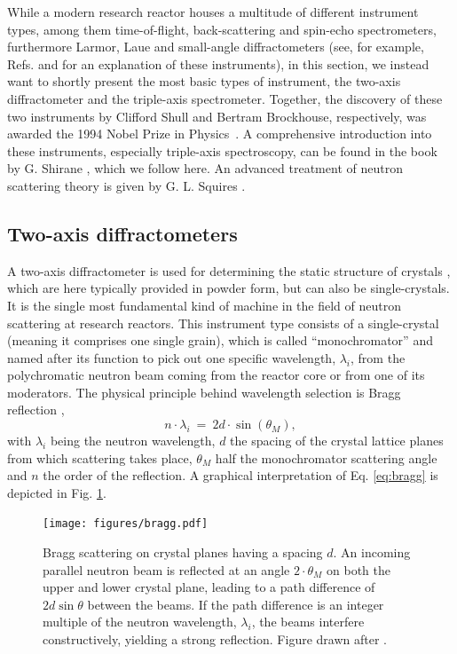 While a modern research reactor houses a multitude of different instrument types, among them time-of-flight,
back-scattering and spin-echo spectrometers, furthermore Larmor, Laue and small-angle diffractometers (see, for example,
Refs. \cite{ExperimentalFacilites} and \cite[pp. 15-18]{Shirane2002} for an explanation of these instruments), in
this section, we instead want to shortly present the most basic types of instrument, the two-axis diffractometer
and the triple-axis spectrometer. Together, the discovery of these two instruments by Clifford Shull and Bertram Brockhouse,
respectively, was awarded the 1994 Nobel Prize in Physics~\cite{web_nobel1994}.
A comprehensive introduction into these instruments, especially triple-axis spectroscopy, can be found in the
book by G. Shirane \cite{Shirane2002}, which we follow here.
An advanced treatment of neutron scattering theory is given by G. L. Squires \cite{Squires2012}.


\subsection{Two-axis diffractometers}

A two-axis diffractometer is used for determining the static structure of crystals \cite[pp. 89f]{Gross2012},
which are here typically provided in powder form, but can also be single-crystals.
It is the single most fundamental kind of machine in the field of
neutron scattering at research reactors. This instrument type consists of a single-crystal (meaning it comprises one
single grain), which is called ``monochromator'' \cite[pp. 57-73]{Shirane2002} and named after its function to pick out one specific wavelength,
$\lambda_i$, from the polychromatic neutron beam coming from the reactor core or from one of its moderators.
The physical principle behind wavelength selection is Bragg reflection \cite[p. 68]{Gross2012} \cite[p. 13]{Shirane2002},
\begin{equation}
	\label{eq:bragg}
	n \cdot \lambda_i \ =\  2 d \cdot \sin\left( \theta_M \right),
\end{equation}
with $\lambda_i$ being the neutron wavelength, $d$ the spacing of the crystal lattice planes from which scattering
takes place, $\theta_M$ half the monochromator scattering angle and $n$ the order of the reflection. A graphical
interpretation of Eq. \ref{eq:bragg} is depicted in Fig. \ref{fig:braggscattering}.

\begin{figure}[htb]
	\centering
	\texttt{[image: figures/bragg.pdf]}
	\caption[Bragg scattering.]{
		Bragg scattering on crystal planes having a spacing $d$. An incoming parallel neutron beam is reflected at an
		angle $2 \cdot \theta_M$ on both the upper and lower crystal plane, leading to a path difference of
		$2d \sin\theta$ between the beams. If the path difference is an integer multiple of the neutron wavelength,
		$\lambda_i$, the beams interfere constructively, yielding a strong reflection.
		Figure drawn after \cite[p. 68, Fig. 2.7]{Gross2012}. }
	\label{fig:braggscattering}
\end{figure}

